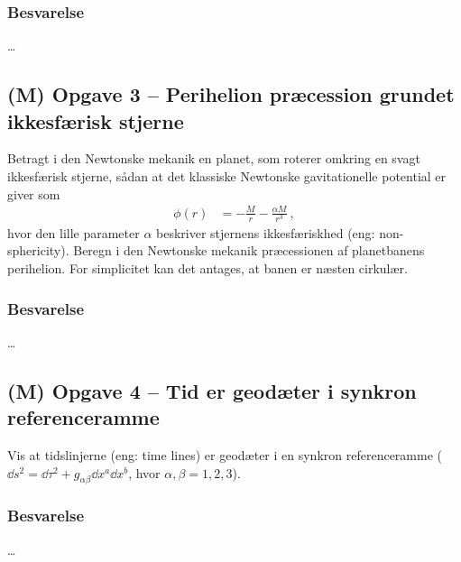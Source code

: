 \documentclass[../main.tex]{subfiles}
\begin{document}

\subsubsection*{Besvarelse}

\ldots




\subsection{(M) Opgave 3 -- Perihelion præcession grundet ikkesfærisk stjerne}
\setcounter{subsection}{3}
\setcounter{equation}{0}

Betragt i den Newtonske mekanik en planet, som roterer omkring en svagt ikkesfærisk stjerne, sådan at det klassiske Newtonske gavitationelle potential er giver som
\begin{align}
    \phi(r) &= - \frac{M}{r} - \frac{\alpha M}{r^3} \: ,
\end{align}
hvor den lille parameter $\alpha$ beskriver stjernens ikkesfæriskhed (eng: non-sphericity). Beregn i den Newtonske mekanik præcessionen af planetbanens perihelion. For simplicitet kan det antages, at banen er næsten cirkulær.


\subsubsection*{Besvarelse}

\ldots




\subsection{(M) Opgave 4 -- Tid er geodæter i synkron referenceramme}
\setcounter{subsection}{4}
\setcounter{equation}{0}

Vis at tidslinjerne (eng: time lines) er geodæter i en synkron referenceramme ($\dd s^2 = \dd \tau^2 + g_{\alpha\beta} \dd x^a \dd x^b$, hvor $\alpha,\beta = 1,2,3$).


\subsubsection*{Besvarelse}

\ldots



\end{document}
